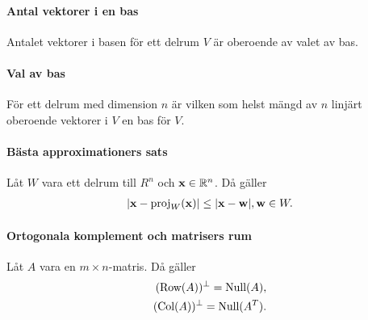 \proof

\paragraph{Antal vektorer i en bas}
Antalet vektorer i basen för ett delrum $V$ är oberoende av valet av bas.

\proof

\paragraph{Val av bas}
För ett delrum med dimension $n$ är vilken som helst mängd av $n$ linjärt oberoende vektorer i $V$ en bas för $V$.

\proof

\paragraph{Bästa approximationers sats}
Låt $W$ vara ett delrum till $R^n$ och $\vect{x}\in\R^n$. Då gäller
\begin{align*}
	\abs{\vect{x} - \proj{W}{\vect{x}}} \leq \abs{\vect{x} - \vect{w}}, \vect{w}\in W.
\end{align*}

\proof

\paragraph{Ortogonala komplement och matrisers rum}
Låt $A$ vara en $m\times n$-matris. Då gäller
\begin{align*}
	(\text{Row}(A))^\perp = \text{Null}(A), \\
	(\text{Col}(A))^\perp = \text{Null}(A^T).
\end{align*}

\proof
